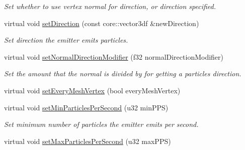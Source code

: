 \begin{DoxyCompactItemize}
\begin{DoxyCompactList}\small\item\em Set whether to use vertex normal for direction, or direction specified. \end{DoxyCompactList}\item 
\hypertarget{classirr_1_1scene_1_1_c_particle_animated_mesh_scene_node_emitter_a32c829775c24738168807351a2d769bc}{virtual void \hyperlink{classirr_1_1scene_1_1_c_particle_animated_mesh_scene_node_emitter_a32c829775c24738168807351a2d769bc}{set\-Direction} (const core\-::vector3df \&new\-Direction)}\label{classirr_1_1scene_1_1_c_particle_animated_mesh_scene_node_emitter_a32c829775c24738168807351a2d769bc}

\begin{DoxyCompactList}\small\item\em Set direction the emitter emits particles. \end{DoxyCompactList}\item 
\hypertarget{classirr_1_1scene_1_1_c_particle_animated_mesh_scene_node_emitter_a182a06bf68d5619ef880dd606007d256}{virtual void \hyperlink{classirr_1_1scene_1_1_c_particle_animated_mesh_scene_node_emitter_a182a06bf68d5619ef880dd606007d256}{set\-Normal\-Direction\-Modifier} (f32 normal\-Direction\-Modifier)}\label{classirr_1_1scene_1_1_c_particle_animated_mesh_scene_node_emitter_a182a06bf68d5619ef880dd606007d256}

\begin{DoxyCompactList}\small\item\em Set the amount that the normal is divided by for getting a particles direction. \end{DoxyCompactList}\item 
virtual void \hyperlink{classirr_1_1scene_1_1_c_particle_animated_mesh_scene_node_emitter_a491195f50cd08a710f335aa8ce46b23a}{set\-Every\-Mesh\-Vertex} (bool every\-Mesh\-Vertex)
\item 
\hypertarget{classirr_1_1scene_1_1_c_particle_animated_mesh_scene_node_emitter_aa78c5b5425ad49137800a1e33c4e402a}{virtual void \hyperlink{classirr_1_1scene_1_1_c_particle_animated_mesh_scene_node_emitter_aa78c5b5425ad49137800a1e33c4e402a}{set\-Min\-Particles\-Per\-Second} (u32 min\-P\-P\-S)}\label{classirr_1_1scene_1_1_c_particle_animated_mesh_scene_node_emitter_aa78c5b5425ad49137800a1e33c4e402a}

\begin{DoxyCompactList}\small\item\em Set minimum number of particles the emitter emits per second. \end{DoxyCompactList}\item 
\hypertarget{classirr_1_1scene_1_1_c_particle_animated_mesh_scene_node_emitter_a0b3c6ce310b5b9044ad4fc1fef0618a7}{virtual void \hyperlink{classirr_1_1scene_1_1_c_particle_animated_mesh_scene_node_emitter_a0b3c6ce310b5b9044ad4fc1fef0618a7}{set\-Max\-Particles\-Per\-Second} (u32 max\-P\-P\-S)}\label{classirr_1_1scene_1_1_c_particle_animated_mesh_scene_node_emitter_a0b3c6ce310b5b9044ad4fc1fef0618a7}


\end{DoxyCompactItemize}
